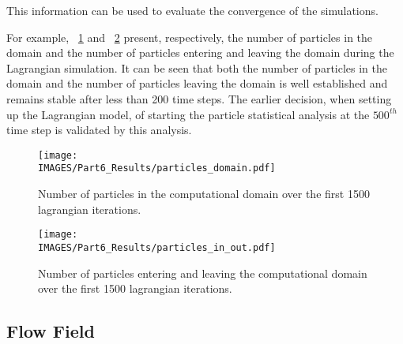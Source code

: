 This information can be used to evaluate the convergence of the simulations.

For example, \figurename~\ref{lag:nb_particles} and \figurename~\ref{lag:particles_leaving} present, respectively, the number of particles in the domain and the number of particles entering and leaving the domain during the Lagrangian simulation.  It can be seen that both the number of particles in the domain and the number of particles leaving the domain is well established and remains stable after less than 200 time steps. The earlier decision, when setting up the Lagrangian model, of starting the particle statistical analysis at the $500^{th}$ time step is validated by this analysis.
%
\begin{figure}[H]
\centering
\texttt{[image: \\IMAGES/Part6\_Results/particles\_domain.pdf]}
\caption{Number of particles in the computational domain over the first 1500 lagrangian iterations.}\label{lag:nb_particles}
\end{figure}
%
\begin{figure}[H]
\centering
\texttt{[image: \\IMAGES/Part6\_Results/particles\_in\_out.pdf]}
\caption{Number of particles entering and leaving the computational domain over the first 1500 lagrangian iterations.}\label{lag:particles_leaving}
\end{figure}
%
\subsection{Flow Field}\label{lag:Resu_flow_field}

